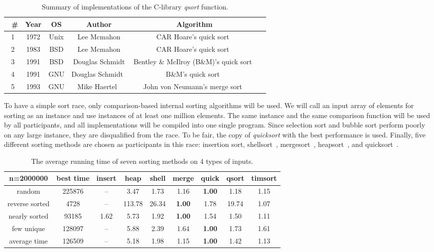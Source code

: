 \documentclass[AMA,STIX1COL]{WileyNJD-v2}
\newcommand{\qusort}{\emph{quicksort }}
\newcommand{\qsort}{\emph{qsort }}
\begin{document}
\begin{table}
\caption{Summary of implementations of the C-library \qsort function.}
\centering
\begin{tabular}{|c|c|c|c|c|c|}
\toprule\
\# & Year & OS & Author & Algorithm\\
\midrule
1 & 1972 & Unix & Lee Mcmahon & CAR Hoare's quick sort~\cite{hoare1961algorithm}\\
2 & 1983 & BSD & Lee Mcmahon & CAR Hoare's quick sort~\cite{hoare1961algorithm}\\
3 & 1991 & BSD & Douglas Schmidt & Bentley \& McIlroy (B\&M)’s quick sort~\cite{bentley1993engineering}\\
4 & 1991 & GNU & Douglas Schmidt~\cite{gnuqsort} & B\&M’s quick sort~\cite{bentley1993engineering}\\
5 & 1993 & GNU & Mike Haertel~\cite{gnumergesort} & John von Neumann's merge sort~\cite{knuth1998sorting}\\
\bottomrule
\end{tabular}
\label{qsortalgo}
\end{table}
To have a simple sort race, only comparison-based internal sorting algorithms will be used. 
We will call an input array of elements for sorting as an instance and use instances of at least one million elements. 
The same instance and the same comparison function will be used by all participants, and all implementations will be compiled into one single program. 
Since selection sort and bubble sort perform poorly on any large instance, they are disqualified from the race. 
To be fair, the copy of \qusort with the best performance is used.
Finally, five different sorting methods are chosen as participants in this race: insertion sort, shellsort~\cite{knuth1998sorting}, mergesort~\cite{mcilroy1993optimistic}, heapsort~\cite{williams1964algorithm}, and quicksort~\cite{hoare1961algorithm}.

\begin{table}
\caption{The average running time of seven sorting methods on 4 types of inputs.}
\centering
\begin{tabular}{|c|c|c|c|c|c|c|c|c|}
\toprule
n=2000000 & best time & insert & heap & shell & merge & quick & qsort & timsort\\
\midrule
random & 225876 & -- & 3.47 & 1.73 & 1.16 & \textbf{1.00} & 1.18 & 1.15 \\
reverse sorted&4728&--&113.78&26.34&\textbf{1.00}&1.78&19.74&1.07\\
nearly sorted & 93185&1.62&5.73&1.92&\textbf{1.00} & 1.54 &1.50 &1.11 \\
few unique & 128097 & --	& 5.88 & 2.39 & 1.64 & \textbf{1.00} & 1.73 & 1.61 \\
average time & 126509 & -- &	5.18& 1.98 & 1.15 & \textbf{1.00} & 1.42 & 1.13 \\
\bottomrule
\end{tabular}
\label{table1}
\end{table}
\end{document}
